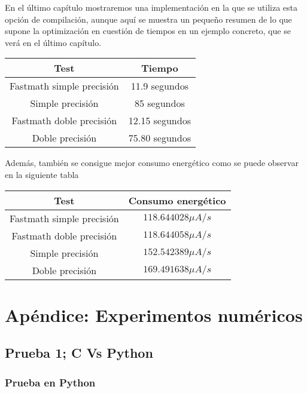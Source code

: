 En el último capítulo mostraremos una implementación en la que se utiliza esta opción de compilación, aunque aquí se muestra un pequeño resumen de lo que supone la optimización en cuestión de tiempos en un ejemplo concreto, que se verá en el último capítulo.

\begin{table}[H]
	\centering
	\begin{tabular}{|c|c|}
		\hline
		\textbf{Test}  & \textbf{Tiempo}        \\ \hline
		Fastmath simple precisión& 11.9 segundos \\ 
		Simple precisión  & 85 segundos    \\
		Fastmath doble precisión & 12.15 segundos    \\
		Doble precisión  & 75.80 segundos \\ \hline
	\end{tabular}%
\end{table}
Además, también se consigue mejor consumo energético como se puede observar en la siguiente tabla
\begin{table}[H]
	\centering
	\begin{tabular}{|c|c|}
		\hline
		\textbf{Test}  & \textbf{Consumo energético}        \\ \hline
		Fastmath simple precisión & $118.644028 \mu A/s$ \\ 
		Fastmath doble precisión  & $118.644058 \mu A/s$ \\
		Simple precisión & $ 152.542389 \mu A/s$ \\
		Doble precisión & $ 169.491638 \mu A/s$ \\
		\hline
	\end{tabular}%
\end{table}

\iffalse
\section{Apéndice: Experimentos numéricos}

\subsection{Prueba 1; C Vs Python}
\label{prueba:cvspython}

\subsubsection{Prueba en Python}


